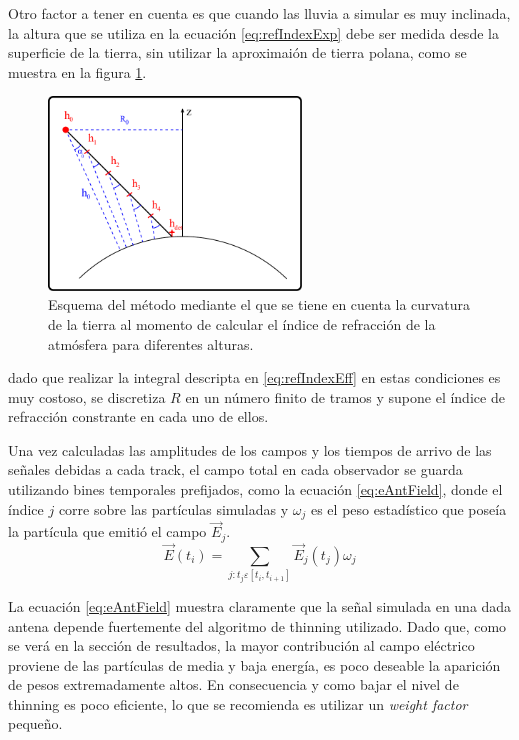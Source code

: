 	Otro factor a tener en cuenta es que cuando las lluvia a simular es muy inclinada, la altura que se utiliza en la ecuaci\'on \ref{eq:refIndexExp} debe ser medida desde la superficie de la tierra, sin utilizar la aproximai\'on de tierra polana, como se muestra en la figura \ref{fig:refIndex}.
	\begin{figure}[ht!]
	\centering
		\includegraphics[width=0.6\textwidth]{fig/simulacionRadio/refIndex}
		\caption{\label{fig:refIndex} Esquema del m\'etodo mediante el que se tiene en cuenta la curvatura de la tierra al momento de calcular el \'indice de refracci\'on de la atm\'osfera para diferentes alturas.}
	\end{figure}
	dado que realizar la integral descripta en \ref{eq:refIndexEff} en estas condiciones es muy costoso, se discretiza $R$ en un n\'umero finito de tramos y supone el \'indice de refracci\'on constrante en cada uno de ellos.
	
	Una vez calculadas las amplitudes de los campos y los tiempos de arrivo de las se\~nales debidas a cada track, el campo total en cada observador se guarda utilizando bines temporales prefijados, como la ecuaci\'on \ref{eq:eAntField}, donde el \'indice $j$ corre sobre las part\'iculas simuladas y $\omega_j$ es el peso estad\'istico que pose\'ia la part\'icula que emiti\'o el campo $\vec{E}_j$.
	\begin{equation}
	\vec{E}(t_i)=\sum_{j:t_j\varepsilon[t_i,t_{i+1}]}\vec{E}_j(t_j)\omega_j
	\label{eq:eAntField}
	\end{equation}
	
	La ecuaci\'on \ref{eq:eAntField} muestra claramente que la se\~nal simulada en una dada antena depende fuertemente del algoritmo de thinning utilizado. 
	Dado que, como se ver\'a en la secci\'on de resultados, la mayor contribuci\'on al campo el\'ectrico proviene de las part\'iculas de media y baja energ\'ia, es poco deseable la aparici\'on de pesos extremadamente altos.
	En consecuencia y como bajar el nivel de thinning es poco eficiente, lo que se recomienda es utilizar un \emph{weight factor} peque\~no.

